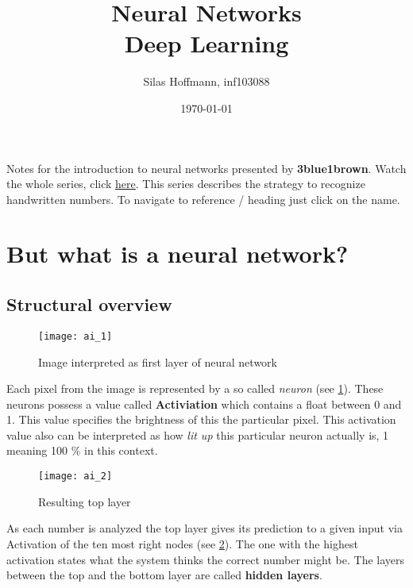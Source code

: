 \documentclass{article}
\title{%
Neural Networks \\
\large Deep Learning}
\author{Silas Hoffmann, inf103088}
\date{\today}
\begin{document}
\maketitle

\vspace{0.5cm}
\tableofcontents
\vspace{1cm}

Notes for the introduction to neural networks presented by \textbf{3blue1brown}. Watch the whole series, click \href{https://www.youtube.com/watch?v=aircAruvnKk}{\color{blue} {here}}. This series describes the strategy to recognize handwritten numbers. To navigate to reference / heading just click on the name.


\clearpage
\listoffigures
\clearpage

\section{But what is a neural network?}


\subsection{Structural overview}

\FloatBarrier

\begin{figure}[h]
	\centering
	\texttt{[image: ai\_1]}
	\caption{Image interpreted as first layer of neural network}
	\label{ai_1}
\end{figure}

Each pixel from the image is represented by a so called \textit{neuron} (see \ref{ai_1}). These neurons possess a value called \textbf{Activiation} which contains a float between 0 and 1. This value specifies the brightness of this the particular pixel. This activation value also can be interpreted as how \textit{lit up} this particular neuron actually is, 1 meaning 100 \% in this context.

\begin{figure}[b!]
	\centering
	\texttt{[image: ai\_2]}
	\caption{Resulting top layer}
	\label{ai_2}
\end{figure}

As each number is analyzed the top layer gives its prediction to a given input via Activation of the ten most right nodes (see \ref{ai_2}). The one with the highest activation states what the system thinks the correct number might be. The layers between the top and the bottom layer are called \textbf{hidden layers}. 
\end{document}
